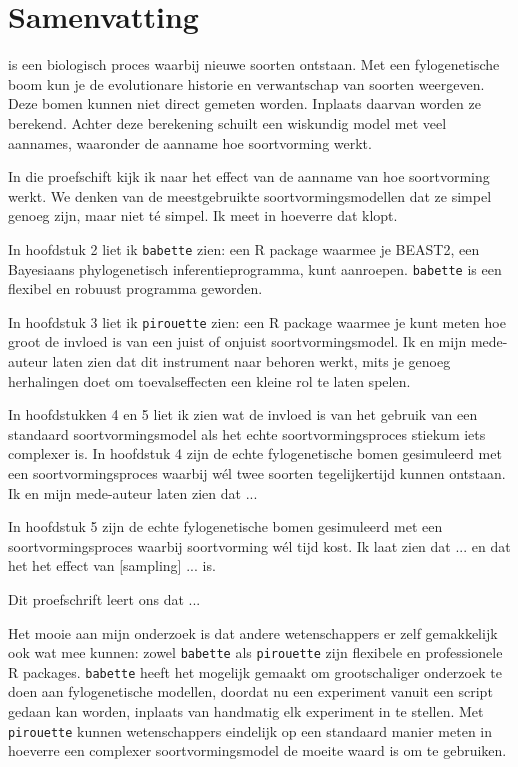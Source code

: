 \chapter*{Samenvatting}

{



\noindent 
{} is een biologisch proces waarbij
nieuwe soorten ontstaan. Met een fylogenetische boom
kun je de evolutionare historie en verwantschap van soorten weergeven.
Deze bomen kunnen niet direct gemeten worden. Inplaats daarvan
worden ze berekend. Achter deze berekening schuilt een wiskundig model
met veel aannames, waaronder de aanname hoe soortvorming werkt.

In die proefschift kijk ik naar het effect van de aanname van hoe soortvorming
werkt. We denken van de meestgebruikte soortvormingsmodellen dat ze simpel
genoeg zijn, maar niet t\'{e} simpel. Ik meet in hoeverre dat klopt.

In hoofdstuk 2 liet ik \verb;babette; zien: een R package waarmee je BEAST2, 
een Bayesiaans phylogenetisch inferentieprogramma, kunt aanroepen. 
\verb;babette; is een flexibel en robuust programma geworden.

In hoofdstuk 3 liet ik \verb;pirouette; zien: een R package waarmee
je kunt meten hoe groot de invloed is van een juist of onjuist 
soortvormingsmodel. Ik en mijn mede-auteur laten zien dat dit instrument naar behoren werkt, mits
je genoeg herhalingen doet om toevalseffecten een kleine rol te laten spelen.

In hoofdstukken 4 en 5 liet ik zien wat de invloed is van het gebruik van een standaard 
soortvormingsmodel als het echte soortvormingsproces stiekum iets complexer is.
In hoofdstuk 4 zijn de echte fylogenetische bomen gesimuleerd met een 
soortvormingsproces waarbij w\'{e}l twee soorten tegelijkertijd kunnen ontstaan.
Ik en mijn mede-auteur laten zien dat ...

In hoofdstuk 5 zijn de echte fylogenetische bomen gesimuleerd met een 
soortvormingsproces waarbij soortvorming w\'{e}l tijd kost. Ik laat zien
dat ... en dat het het effect van [sampling] ... is.  

Dit proefschrift leert ons dat ...

Het mooie aan mijn onderzoek is dat andere wetenschappers er zelf gemakkelijk 
ook wat mee kunnen:
zowel \verb;babette; als \verb;pirouette; zijn flexibele en professionele 
R packages. \verb;babette; heeft het mogelijk gemaakt om grootschaliger 
onderzoek te doen aan fylogenetische modellen, doordat nu een experiment
vanuit een script gedaan kan worden, inplaats van handmatig elk 
experiment in te stellen. Met \verb;pirouette; kunnen wetenschappers 
eindelijk op een standaard manier meten in hoeverre een complexer 
soortvormingsmodel de moeite waard is om te gebruiken. 

} %
